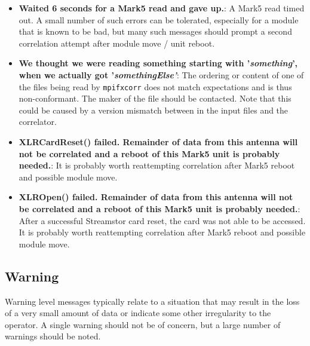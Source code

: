 \begin{itemize}
\item {\bf Waited 6 seconds for a Mark5 read and gave up.}:
A Mark5 read timed out.
A small number of such errors can be tolerated, especially for a module that is known to be bad, but many such messages
should prompt a second correlation attempt after module move / unit reboot.

\item {\bf We thought we were reading something starting with '{\it something}', when we actually got '{\it somethingElse'}}:
The ordering or content of one of the files being read by {\tt mpifxcorr} does not match expectations and is thus non-conformant.
The maker of the file should be contacted.
Note that this could be caused by a version mismatch between in the input files and the correlator.

\item {\bf XLRCardReset() failed.  Remainder of data from this antenna will not be correlated and a reboot of this Mark5 unit is probably needed.}:
It is probably worth reattempting correlation after Mark5 reboot and possible module move.

\item {\bf XLROpen() failed.  Remainder of data from this antenna will not be correlated and a reboot of this Mark5 unit is probably needed.}:
After a successful Streamstor card reset, the card was not able to be accessed.
It is probably worth reattempting correlation after Mark5 reboot and possible module move.

\end{itemize}





\subsection{Warning}

Warning level messages typically relate to a situation that may result in the loss of a very small amount of data or indicate some other irregularity to the operator.
A single warning should not be of concern, but a large number of warnings should be noted.

